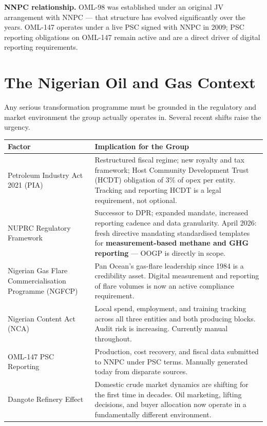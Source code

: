 \documentclass[10pt]{article}
\begin{document}
\vspace{4pt}
{\small\color{darkgrey}
\textbf{NNPC relationship.}\enspace
OML-98 was established under an original JV arrangement with NNPC --- that
structure has evolved significantly over the years. OML-147 operates under a live
PSC signed with NNPC in 2009; PSC reporting obligations on OML-147 remain active
and are a direct driver of digital reporting requirements.
}

\vspace{10pt}

\section{The Nigerian Oil and Gas Context}

{\small
Any serious transformation programme must be grounded in the regulatory and market
environment the group actually operates in. Several recent shifts raise the urgency.
}

\vspace{4pt}
\small
\begin{tabularx}{\columnwidth}{@{}lX@{}}
\toprule
\textbf{Factor} & \textbf{Implication for the Group} \\
\midrule
Petroleum Industry Act 2021 (PIA)
  & Restructured fiscal regime; new royalty and tax framework; Host Community
    Development Trust (HCDT) obligation of 3\% of opex per entity. Tracking and
    reporting HCDT is a legal requirement, not optional. \\[4pt]
NUPRC Regulatory Framework
  & Successor to DPR; expanded mandate, increased reporting cadence and data
    granularity. April 2026: fresh directive mandating standardised templates for
    \textbf{measurement-based methane and GHG reporting} --- OOGP is directly in scope. \\[4pt]
Nigerian Gas Flare Commercialisation Programme (NGFCP)
  & Pan Ocean's gas-flare leadership since 1984 is a credibility asset. Digital
    measurement and reporting of flare volumes is now an active compliance requirement. \\[4pt]
Nigerian Content Act (NCA)
  & Local spend, employment, and training tracking across all three entities and
    both producing blocks. Audit risk is increasing. Currently manual throughout. \\[4pt]
OML-147 PSC Reporting
  & Production, cost recovery, and fiscal data submitted to NNPC under PSC
    terms. Manually generated today from disparate sources. \\[4pt]
Dangote Refinery Effect
  & Domestic crude market dynamics are shifting for the first time in decades.
    Oil marketing, lifting decisions, and buyer allocation now operate in a
    fundamentally different environment. \\
\bottomrule
\end{tabularx}
\normalsize
\end{document}
